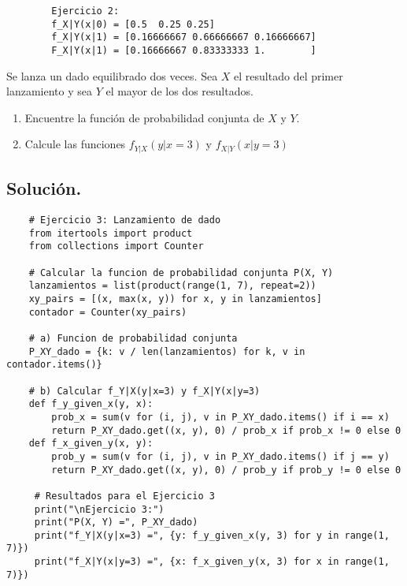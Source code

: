 \documentclass[a4paper,12pt]{article}
\begin{document}
    \begin{verbatim}
        Ejercicio 2:
        f_X|Y(x|0) = [0.5  0.25 0.25]
        f_X|Y(x|1) = [0.16666667 0.66666667 0.16666667]
        F_X|Y(x|1) = [0.16666667 0.83333333 1.        ]
    \end{verbatim}
    
    \begin{example}
        Se lanza un dado equilibrado dos veces. Sea $X$ el resultado del primer lanzamiento y sea $Y$ el mayor de los dos resultados.
        \begin{enumerate}[label=\alph*)]  
             \item Encuentre la función de probabilidad conjunta de $X$ y $Y$.
             \item Calcule las funciones $f_{Y|X}(y | x = 3)$ y $f_{X|Y}(x | y = 3)$
        \end{enumerate}
    \end{example}

    \subsection*{Solución.}

    \begin{lstlisting}
    # Ejercicio 3: Lanzamiento de dado
    from itertools import product
    from collections import Counter
        
    # Calcular la funcion de probabilidad conjunta P(X, Y)
    lanzamientos = list(product(range(1, 7), repeat=2))
    xy_pairs = [(x, max(x, y)) for x, y in lanzamientos]
    contador = Counter(xy_pairs)
        
    # a) Funcion de probabilidad conjunta
    P_XY_dado = {k: v / len(lanzamientos) for k, v in contador.items()}
        
    # b) Calcular f_Y|X(y|x=3) y f_X|Y(x|y=3)
    def f_y_given_x(y, x):
        prob_x = sum(v for (i, j), v in P_XY_dado.items() if i == x)
        return P_XY_dado.get((x, y), 0) / prob_x if prob_x != 0 else 0
    def f_x_given_y(x, y):
        prob_y = sum(v for (i, j), v in P_XY_dado.items() if j == y)
        return P_XY_dado.get((x, y), 0) / prob_y if prob_y != 0 else 0

     # Resultados para el Ejercicio 3
     print("\nEjercicio 3:")
     print("P(X, Y) =", P_XY_dado)
     print("f_Y|X(y|x=3) =", {y: f_y_given_x(y, 3) for y in range(1, 7)})
     print("f_X|Y(x|y=3) =", {x: f_x_given_y(x, 3) for x in range(1, 7)})
    \end{lstlisting}
\end{document}
